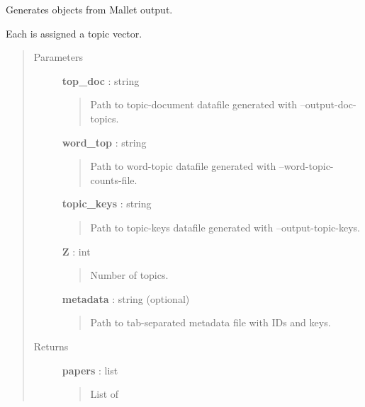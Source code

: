 \documentclass[letterpaper,10pt,english]{sphinxmanual}
\begin{document}

\begin{fulllineitems}
\label{tethne.readers:tethne.readers.mallet.read}
Generates {\hyperref[tethne:tethne.data.Paper]{}} objects from Mallet output.

Each {\hyperref[tethne:tethne.data.Paper]{}} is assigned a topic vector.
\begin{quote}\begin{description}
\item[{Parameters }] \leavevmode
\textbf{top\_doc} : string
\begin{quote}

Path to topic-document datafile generated with --output-doc-topics.
\end{quote}

\textbf{word\_top} : string
\begin{quote}

Path to word-topic datafile generated with --word-topic-counts-file.
\end{quote}

\textbf{topic\_keys} : string
\begin{quote}

Path to topic-keys datafile generated with --output-topic-keys.
\end{quote}

\textbf{Z} : int
\begin{quote}

Number of topics.
\end{quote}

\textbf{metadata} : string (optional)
\begin{quote}

Path to tab-separated metadata file with IDs and {\hyperref[tethne:tethne.data.Paper]{}} keys.
\end{quote}

\item[{Returns }] \leavevmode
\textbf{papers} : list
\begin{quote}

List of {\hyperref[tethne:tethne.data.Paper]{}}
\end{quote}

\end{description}\end{quote}

\end{fulllineitems}
\end{document}
